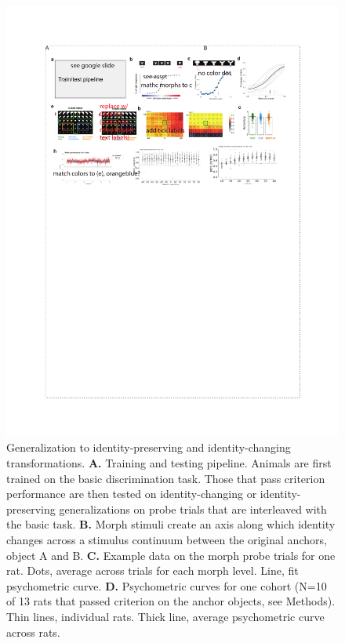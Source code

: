 \begin{figure}[t!]
\includegraphics[width=\textwidth]{figures/chapter_1/fig_1-3_behavior_generalization/fig_1-3_behavior_generalization.pdf}
    \vspace{.1in}
    \caption[Generalization of visual behavior]{Generalization to identity-preserving and identity-changing transformations. 
    \textbf{A.} Training and testing pipeline. Animals are first trained on the basic discrimination task. Those that pass criterion performance are then tested on identity-changing or identity-preserving generalizations on probe trials that are interleaved with the basic task. 
    \textbf{B.} Morph stimuli create an axis along which identity changes across a stimulus continuum between the original anchors, object A and B. 
    \textbf{C.} Example data on the morph probe trials for one rat. Dots, average across trials for each morph level. Line, fit psychometric curve. 
    \textbf{D.} Psychometric curves for one cohort (N=10 of 13 rats that passed criterion on the anchor objects, see Methods). Thin lines, individual rats. Thick line, average psychometric curve across rats. 
}
\end{figure}
